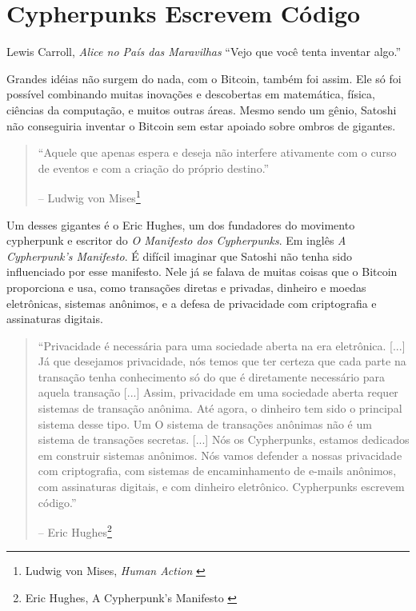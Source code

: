 \chapter{Cypherpunks Escrevem Código}
\label{les:20}

\begin{chapquote}{Lewis Carroll, \textit{Alice no País das Maravilhas}}
\enquote{Vejo que você tenta inventar algo.}
\end{chapquote}

Grandes idéias não surgem do nada, com o Bitcoin, também foi assim. 
Ele só foi possível combinando muitas inovações e descobertas em matemática, 
física, ciências da computação, e muitos outras áreas. Mesmo sendo um gênio, 
Satoshi não conseguiria inventar o Bitcoin sem estar apoiado sobre ombros de gigantes.

\begin{quotation}\begin{samepage}
\enquote{Aquele que apenas espera e deseja não interfere ativamente com o curso de eventos e com a criação do próprio destino.}
\begin{flushright} -- Ludwig von Mises\footnote{Ludwig von Mises, \textit{Human Action} \cite{human-action}}
\end{flushright}\end{samepage}\end{quotation}

Um desses gigantes é o Eric Hughes, um dos fundadores do movimento cypherpunk
e escritor do \textit{O Manifesto dos Cypherpunks}. Em inglês \textit{A Cypherpunk's Manifesto}. 
É difícil imaginar que Satoshi 
não tenha sido influenciado por esse manifesto. Nele já se falava de muitas coisas 
que o Bitcoin proporciona e usa, como transações diretas e privadas, dinheiro e moedas 
eletrônicas, sistemas anônimos, e a defesa de privacidade com criptografia e assinaturas digitais.

\begin{quotation}\begin{samepage}
\enquote{Privacidade é necessária para uma sociedade aberta na era eletrônica.
	[...] Já que desejamos privacidade, nós temos que ter certeza que cada parte 
	na transação tenha conhecimento só do que é diretamente necessário para 
	aquela transação [...]
	Assim, privacidade em uma sociedade aberta requer sistemas de transação anônima. 
	Até agora, o dinheiro tem sido o principal sistema desse tipo. Um
	O sistema de transações anônimas não é um sistema de transações secretas. [...]
	Nós os Cypherpunks, estamos dedicados em construir sistemas anônimos. Nós vamos 
	defender a nossas privacidade com criptografia, com sistemas de encaminhamento 
	de e-mails anônimos, com assinaturas digitais, e com dinheiro eletrônico. 
	Cypherpunks escrevem código.}

\begin{flushright} -- Eric Hughes\footnote{Eric Hughes, A Cypherpunk's Manifesto \cite{cypherpunk-manifesto}}
\end{flushright}\end{samepage}\end{quotation}

